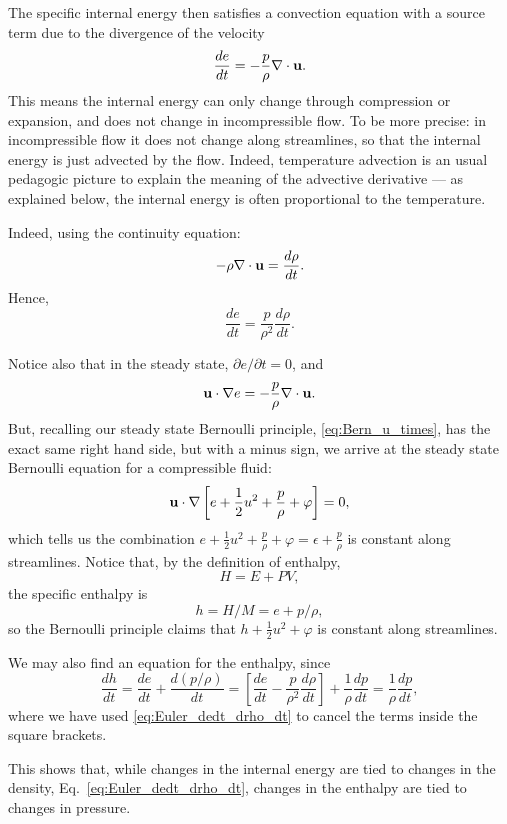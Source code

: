 The specific internal energy then satisfies a convection equation with
a source term due to the divergence of the velocity
\begin{equation}
  \label{eq:Euler_energy}
  \frac{d e}{dt}  = -  \frac{p}{\rho} \nabla\cdot \mathbf{u} .
\end{equation}
This means the internal energy can only change through compression
or expansion, and does not change in incompressible flow.
To be more precise: in incompressible flow it does not change along
streamlines, so that the internal energy is just advected by the flow.
Indeed, temperature advection is an usual pedagogic picture to
explain the meaning of the advective derivative ---
as explained below, the internal energy is often
proportional to the temperature.


Indeed, using the continuity equation:
\[
- \rho \nabla\cdot \mathbf{u} = \frac{d\rho}{dt} .
\]
Hence,
\begin{equation}
\label{eq:Euler_dedt_drho_dt}
\frac{d e}{dt}  = 
\frac{p}{\rho^2} \frac{d\rho}{dt} .
\end{equation}



Notice also that in the steady state, $\partial e/\partial t=0$, and
\[
\mathbf{u} \cdot \nabla e = -  \frac{p}{\rho} \nabla\cdot \mathbf{u}.
\]
But, recalling our steady state Bernoulli principle, \eqref{eq:Bern_u_times}, has
the exact same right hand side, but with a minus sign, 
we arrive at the steady state Bernoulli equation for a compressible fluid:
\[
\mathbf{u} \cdot \nabla \left[ e + \frac12 u^2 + \frac{p}{\rho} + \varphi
  \right] = 0 ,
\]
%
which tells us the combination $ e + \frac12 u^2 + \frac{p}{\rho} +
\varphi = \epsilon + \frac{p}{\rho} $ is constant along streamlines.
Notice that, by the definition of enthalpy,
\[
H= E + P V ,
\]
the specific enthalpy is
\[
h=H/M = e + p / \rho ,
\]
so the Bernoulli principle claims that 
$ h + \frac12 u^2 +  \varphi  $
is constant along streamlines.

We may also find an equation for the enthalpy, since
\[
\frac{d h}{d t} =
\frac{d e}{d t}  +  \frac{d (p / \rho) }{dt} =
\left[ \frac{d e}{d t}  -
\frac{ p }{\rho^2}  \frac{d \rho }{dt} \right]  +
\frac{ 1 }{\rho} \frac{d p }{dt}  
= \frac{ 1 }{\rho} \frac{d p }{dt}  ,
\]
where we have used \eqref{eq:Euler_dedt_drho_dt} to cancel the terms
inside the square brackets.

This shows that, while changes in the internal energy are tied to changes in the density,
Eq.~\eqref{eq:Euler_dedt_drho_dt}, changes in the enthalpy are
tied to changes in pressure.


